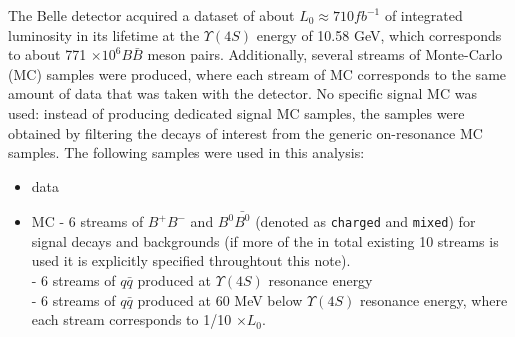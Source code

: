 The Belle detector acquired a dataset of about $L_0 \approx 710 fb^{-1}$ of integrated luminosity in its lifetime at the $\Upsilon(4S)$ energy of 10.58 GeV, which corresponds to about 771 $\times 10^6 B\bar{B}$ meson pairs. Additionally, several streams of Monte-Carlo (MC) samples were produced, where each stream of MC corresponds to the same amount of data that was taken with the detector.
No specific signal MC was used: instead of producing dedicated signal MC samples, the samples were obtained by filtering the decays of interest from the generic on-resonance MC samples.
The following samples were used in this analysis:
\begin{itemize}
    \item data
    \item MC 
    - 6 streams of $B^+B^-$ and $B^0\bar{B^0}$ (denoted as \texttt{charged}
and \texttt{mixed}) for signal decays and backgrounds (if more of the in total existing 10 streams is used it is explicitly specified throughtout this note).\\
    - 6 streams of $q\bar{q}$ produced at $\Upsilon(4S)$ resonance energy \\
    - 6 streams of $q\bar{q}$ produced at 60 MeV below $\Upsilon(4S)$ resonance energy, where each stream corresponds to 1/10 $\times L_0 $.\\
\end{itemize}


